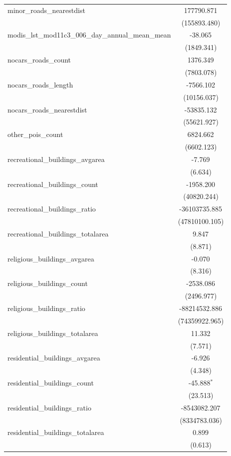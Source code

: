 \begin{table}[!htbp]
\begin{tabular}{@{\extracolsep{5pt}}lc}
 minor_roads_nearestdist & 177790.871$^{}$ \\
  & (155893.480) \\
 modis_lst_mod11c3_006_day_annual_mean_mean & -38.065$^{}$ \\
  & (1849.341) \\
 nocars_roads_count & 1376.349$^{}$ \\
  & (7803.078) \\
 nocars_roads_length & -7566.102$^{}$ \\
  & (10156.037) \\
 nocars_roads_nearestdist & -53835.132$^{}$ \\
  & (55621.927) \\
 other_pois_count & 6824.662$^{}$ \\
  & (6602.123) \\
 recreational_buildings_avgarea & -7.769$^{}$ \\
  & (6.634) \\
 recreational_buildings_count & -1958.200$^{}$ \\
  & (40820.244) \\
 recreational_buildings_ratio & -36103735.885$^{}$ \\
  & (47810100.105) \\
 recreational_buildings_totalarea & 9.847$^{}$ \\
  & (8.871) \\
 religious_buildings_avgarea & -0.070$^{}$ \\
  & (8.316) \\
 religious_buildings_count & -2538.086$^{}$ \\
  & (2496.977) \\
 religious_buildings_ratio & -88214532.886$^{}$ \\
  & (74359922.965) \\
 religious_buildings_totalarea & 11.332$^{}$ \\
  & (7.571) \\
 residential_buildings_avgarea & -6.926$^{}$ \\
  & (4.348) \\
 residential_buildings_count & -45.888$^{*}$ \\
  & (23.513) \\
 residential_buildings_ratio & -8543082.207$^{}$ \\
  & (8334783.036) \\
 residential_buildings_totalarea & 0.899$^{}$ \\
  & (0.613) \\

\end{tabular}
\end{table}
